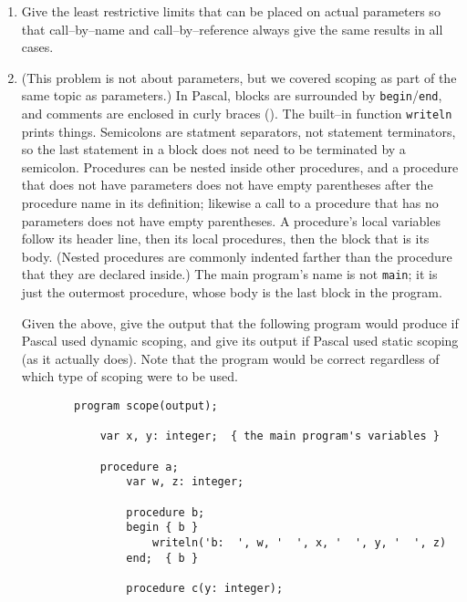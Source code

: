 \documentclass[11pt]{article}
\begin{document}
\begin{enumerate}
    \item Give the least restrictive limits that can be placed on actual
          parameters so that call--by--name and call--by--reference always
          give the same results in all cases.

    \item (This problem is not about parameters, but we covered scoping as
          part of the same topic as parameters.)  In Pascal, blocks are
          surrounded by \texttt{begin}/\texttt{end}, and comments are
          enclosed in curly braces (\texttt{\string{ \string}}).  The
          built--in function \texttt{writeln} prints things.  Semicolons are
          statment separators, not statement terminators, so the last
          statement in a block does not need to be terminated by a
          semicolon.  Procedures can be nested inside other procedures, and
          a procedure that does not have parameters does not have empty
          parentheses after the procedure name in its definition; likewise a
          call to a procedure that has no parameters does not have empty
          parentheses.  A procedure's local variables follow its header
          line, then its local procedures, then the block that is its body.
          (Nested procedures are commonly indented farther than the
          procedure that they are declared inside.)  The main program's name
          is not \texttt{main}; it is just the outermost procedure, whose
          body is the last block in the program.

          Given the above, give the output that the following program would
          produce if Pascal used dynamic scoping, and give its output if
          Pascal used static scoping (as it actually does).  Note that the
          program would be correct regardless of which type of scoping were
          to be used.

          \vspace{-1.5mm}

          \begin{Verbatim}
        program scope(output);

            var x, y: integer;  { the main program's variables }

            procedure a;
                var w, z: integer;

                procedure b;
                begin { b }
                    writeln('b:  ', w, '  ', x, '  ', y, '  ', z)
                end;  { b }

                procedure c(y: integer);


\end{Verbatim}
\end{enumerate}
\end{document}
